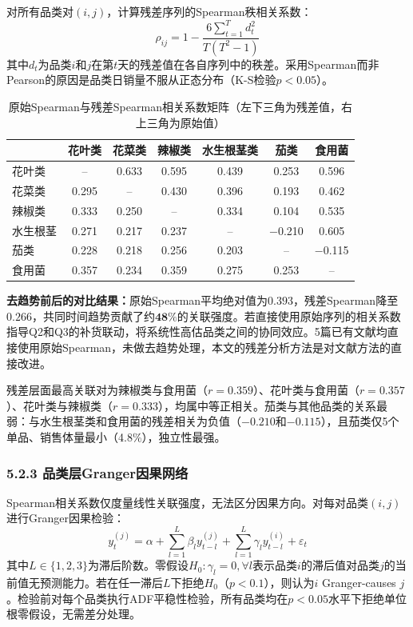 \documentclass[12pt,a4paper]{article}
\begin{document}
对所有品类对$(i, j)$，计算残差序列的Spearman秩相关系数：
\begin{equation}
\rho_{ij} = 1 - \frac{6\sum_{t=1}^{T} d_{t}^2}{T(T^2-1)}
\end{equation}
其中$d_t$为品类$i$和$j$在第$t$天的残差值在各自序列中的秩差。采用Spearman而非Pearson的原因是品类日销量不服从正态分布（K-S检验$p<0.05$）。

\begin{table}[H]
\centering
\caption{原始Spearman与残差Spearman相关系数矩阵（左下三角为残差值，右上三角为原始值）}
\begin{tabular}{l|cccccc}
\toprule
 & 花叶类 & 花菜类 & 辣椒类 & 水生根茎类 & 茄类 & 食用菌 \\
\midrule
花叶类 & -- & 0.633 & 0.595 & 0.439 & 0.253 & 0.596 \\
花菜类 & 0.295 & -- & 0.430 & 0.396 & 0.193 & 0.462 \\
辣椒类 & 0.333 & 0.250 & -- & 0.334 & 0.104 & 0.535 \\
水生根茎 & 0.271 & 0.217 & 0.237 & -- & $-$0.210 & 0.605 \\
茄类 & 0.228 & 0.218 & 0.256 & 0.203 & -- & $-$0.115 \\
食用菌 & 0.357 & 0.234 & 0.359 & 0.275 & 0.253 & -- \\
\bottomrule
\end{tabular}
\end{table}

\textbf{去趋势前后的对比结果：}原始Spearman平均绝对值为$\mathbf{0.393}$，残差Spearman降至$\mathbf{0.266}$，共同时间趋势贡献了约$\mathbf{48\%}$的关联强度。若直接使用原始序列的相关系数指导Q2和Q3的补货联动，将系统性高估品类之间的协同效应。5篇已有文献均直接使用原始Spearman，未做去趋势处理，本文的残差分析方法是对文献方法的直接改进。

残差层面最高关联对为辣椒类与食用菌（$r=0.359$）、花叶类与食用菌（$r=0.357$）、花叶类与辣椒类（$r=0.333$），均属中等正相关。茄类与其他品类的关系最弱：与水生根茎类和食用菌的残差相关为负值（$-0.210$和$-0.115$），且茄类仅5个单品、销售体量最小（4.8\%），独立性最强。

\subsubsection{5.2.3 品类层Granger因果网络}

Spearman相关系数仅度量线性关联强度，无法区分因果方向。对每对品类$(i, j)$进行Granger因果检验：
\begin{equation}
y_{t}^{(j)} = \alpha + \sum_{l=1}^{L} \beta_l y_{t-l}^{(j)} + \sum_{l=1}^{L} \gamma_l y_{t-l}^{(i)} + \varepsilon_t
\end{equation}
其中$L \in \{1, 2, 3\}$为滞后阶数。零假设$H_0: \gamma_l = 0, \forall l$表示品类$i$的滞后值对品类$j$的当前值无预测能力。若在任一滞后$L$下拒绝$H_0$（$p < 0.1$），则认为$i$ Granger-causes $j$。检验前对每个品类执行ADF平稳性检验，所有品类均在$p<0.05$水平下拒绝单位根零假设，无需差分处理。
\end{document}
